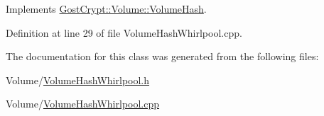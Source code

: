 Implements \hyperlink{class_gost_crypt_1_1_volume_1_1_volume_hash_a58c69a4ea5a247454bd6b4dd6c736ecd}{Gost\+Crypt\+::\+Volume\+::\+Volume\+Hash}.



Definition at line 29 of file Volume\+Hash\+Whirlpool.\+cpp.



The documentation for this class was generated from the following files\+:\begin{DoxyCompactItemize}
\item 
Volume/\hyperlink{_volume_hash_whirlpool_8h}{Volume\+Hash\+Whirlpool.\+h}\item 
Volume/\hyperlink{_volume_hash_whirlpool_8cpp}{Volume\+Hash\+Whirlpool.\+cpp}\end{DoxyCompactItemize}
